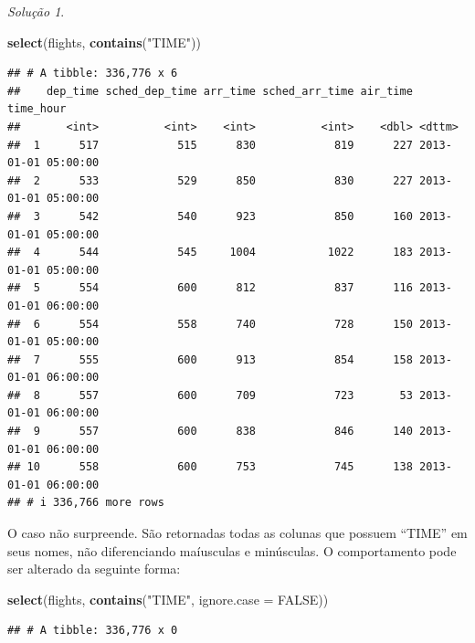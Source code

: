 \documentclass[
]{latex/krantz}
\newenvironment{Shaded}{\begin{snugshade}}{\end{snugshade}}
\newcommand{\AttributeTok}[1]{\textcolor[rgb]{0.13,0.29,0.53}{#1}}
\newcommand{\ConstantTok}[1]{\textcolor[rgb]{0.56,0.35,0.01}{#1}}
\newcommand{\FunctionTok}[1]{\textcolor[rgb]{0.13,0.29,0.53}{\textbf{#1}}}
\newcommand{\NormalTok}[1]{#1}
\newcommand{\StringTok}[1]{\textcolor[rgb]{0.31,0.60,0.02}{#1}}
\theoremstyle{definition}
\theoremstyle{definition}
\theoremstyle{definition}
\theoremstyle{definition}
\theoremstyle{remark}
\newtheorem*{solution}{Solução}
\begin{document}
\begin{solution}
\leavevmode

\begin{Shaded}
\begin{Highlighting}[]
\FunctionTok{select}\NormalTok{(flights, }\FunctionTok{contains}\NormalTok{(}\StringTok{"TIME"}\NormalTok{))}
\end{Highlighting}
\end{Shaded}

\begin{verbatim}
## # A tibble: 336,776 x 6
##    dep_time sched_dep_time arr_time sched_arr_time air_time time_hour          
##       <int>          <int>    <int>          <int>    <dbl> <dttm>             
##  1      517            515      830            819      227 2013-01-01 05:00:00
##  2      533            529      850            830      227 2013-01-01 05:00:00
##  3      542            540      923            850      160 2013-01-01 05:00:00
##  4      544            545     1004           1022      183 2013-01-01 05:00:00
##  5      554            600      812            837      116 2013-01-01 06:00:00
##  6      554            558      740            728      150 2013-01-01 05:00:00
##  7      555            600      913            854      158 2013-01-01 06:00:00
##  8      557            600      709            723       53 2013-01-01 06:00:00
##  9      557            600      838            846      140 2013-01-01 06:00:00
## 10      558            600      753            745      138 2013-01-01 06:00:00
## # i 336,766 more rows
\end{verbatim}

O caso não surpreende. São retornadas todas as colunas que possuem ``TIME'' em seus nomes, não diferenciando maíusculas e minúsculas. O comportamento pode ser alterado da seguinte forma:

\begin{Shaded}
\begin{Highlighting}[]
\FunctionTok{select}\NormalTok{(flights, }\FunctionTok{contains}\NormalTok{(}\StringTok{"TIME"}\NormalTok{, }\AttributeTok{ignore.case =} \ConstantTok{FALSE}\NormalTok{))}
\end{Highlighting}
\end{Shaded}

\begin{verbatim}
## # A tibble: 336,776 x 0
\end{verbatim}

\end{solution}
\end{document}
